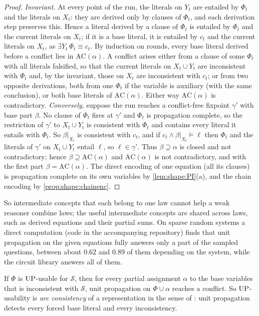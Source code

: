 \begin{proof}
\emph{Invariant.} At every point of the run, the literals on $Y_t$ are entailed by $\Phi_t$ and the literals on $X_t$: they are derived only by clauses of $\Phi_t$, and each derivation step preserves this. Hence a literal derived by a clause of $\Phi_t$ is entailed by $\Phi_t$ and the current literals on $X_t$; if it is a base literal, it is entailed by $c_t$ and the current literals on $X_t$, as $\exists Y_t\,\Phi_t\equiv c_t$. By induction on rounds, every base literal derived before a conflict lies in $\mathrm{AC}(\alpha)$. A conflict arises either from a clause of some $\Phi_t$ with all literals falsified, so that the current literals on $X_t\cup Y_t$ are inconsistent with $\Phi_t$ and, by the invariant, those on $X_t$ are inconsistent with $c_t$; or from two opposite derivations, both from one $\Phi_t$ if the variable is auxiliary (with the same conclusion), or both base literals of $\mathrm{AC}(\alpha)$. Either way $\mathrm{AC}(\alpha)$ is contradictory. \emph{Conversely,} suppose the run reaches a conflict-free fixpoint $\gamma'$ with base part $\beta$. No clause of $\Phi_t$ fires at $\gamma'$ and $\Phi_t$ is propagation complete, so the restriction of $\gamma'$ to $X_t\cup Y_t$ is consistent with $\Phi_t$ and contains every literal it entails with $\Phi_t$. So $\beta|_{X_t}$ is consistent with $c_t$, and if $c_t\wedge\beta|_{X_t}\models\ell$ then $\Phi_t$ and the literals of $\gamma'$ on $X_t\cup Y_t$ entail $\ell$, so $\ell\in\gamma'$. Thus $\beta\supseteq\alpha$ is closed and not contradictory; hence $\beta\supseteq\mathrm{AC}(\alpha)$ and $\mathrm{AC}(\alpha)$ is not contradictory, and with the first part $\beta=\mathrm{AC}(\alpha)$. The direct encoding of one equation (all its clauses) is propagation complete on its own variables by \cref{lem:shape:PI}(a), and the chain encoding by \cref{prop:shape:chainenc}.
\end{proof}

So intermediate concepts that each belong to one law cannot help a weak reasoner combine laws; the useful intermediate concepts are shared across laws, such as derived equations and their partial sums. On sparse random systems a direct computation (code in the accompanying repository) finds that unit propagation on the given equations fully answers only a part of the sampled questions, between about $0.62$ and $0.89$ of them depending on the system, while the circuit library answers all of them.

\begin{lemma}\label{lem:shape:arc}
If $\Phi$ is $\mathrm{UP}$-usable for $\mathcal S$, then for every partial assignment $\alpha$ to the base variables that is inconsistent with $\mathcal S$, unit propagation on $\Phi\cup\alpha$ reaches a conflict. So $\mathrm{UP}$-usability is \emph{arc consistency} of a representation in the sense of \citet{gwynne2014sat}: unit propagation detects every forced base literal and every inconsistency.
\end{lemma}


